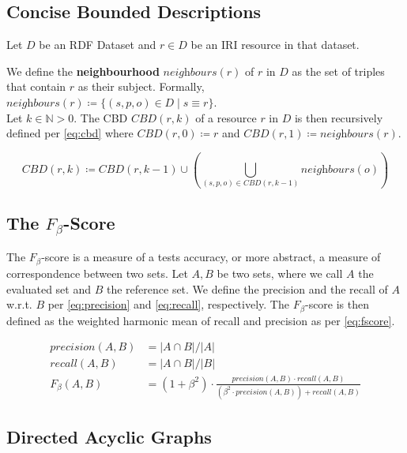 \subsection{Concise Bounded Descriptions}

Let $D$ be an \ac{RDF} Dataset and $r\in D$ be an \ac{IRI} resource in that dataset.

We define the \textbf{neighbourhood} $\textit{neighbours}(r)$ of $r$ in $D$ as the set of triples that contain $r$ as their subject.
Formally, $\textit{neighbours}(r) \coloneq \{ (s, p, o) \in D \mid s \equiv r \}$.\\

Let $k\in\mathbb{N} > 0$.
The \ac{CBD} $\textit{CBD}(r, k)$ of a resource $r$ in $D$ is then recursively defined per \autoref{eq:cbd} where $\textit{CBD}(r, 0) \coloneq r$ and $\textit{CBD}(r, 1) \coloneq \textit{neighbours}(r)$.

\begin{equation}
  \textit{CBD}(r, k) \coloneq \textit{CBD}(r, k-1) \cup \left( \bigcup_{(s, p, o) \in \textit{CBD}(r, k-1)} \textit{neighbours}(o) \right)
  \label{eq:cbd}
\end{equation}

\subsection{The \texorpdfstring{$F_\beta$}{F-beta}-Score}
The $F_\beta$-score is a measure of a tests accuracy, or more abstract, a measure of correspondence between two sets.
Let $A, B$ be two sets, where we call $A$ the evaluated set and $B$ the reference set.
We define the precision and the recall of $A$ w.r.t. $B$ per \autoref{eq:precision} and \autoref{eq:recall}, respectively.
The $F_\beta$-score is then defined as the weighted harmonic mean of recall and precision as per \autoref{eq:fscore}.

\begin{align}
\textit{precision}(A,B) & = |A\cap B|/|A| \label{eq:precision} \\
\textit{recall}(A,B) & = |A\cap B|/|B| \label{eq:recall} \\ 
 F_\beta(A,B) & =  (1 + \beta^2) \cdot \frac{\textit{precision}(A,B) \cdot \textit{recall}(A,B)}{(\beta^2 \cdot \textit{precision}(A,B)) + \textit{recall}(A,B)}  \label{eq:fscore}
\end{align}


\subsection{Directed Acyclic Graphs}

